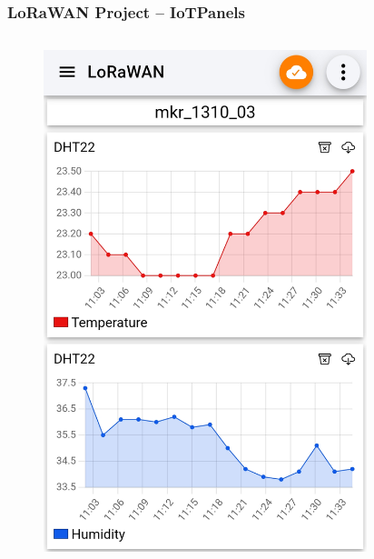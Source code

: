 \documentclass{beamer}
\begin{document}
\begin{frame}
    \frametitle{LoRaWAN Project – IoTPanels}
    \begin{columns}
        \begin{column}{0.5\textwidth}
            \begin{figure}
                \centering
                \includegraphics[width=\textwidth]{images/iotpanel_1.png}
            \end{figure}
        \end{column}
        \begin{column}{0.5\textwidth}
            \begin{figure}
                \centering

\end{figure}
\end{column}
\end{columns}
\end{frame}
\end{document}
